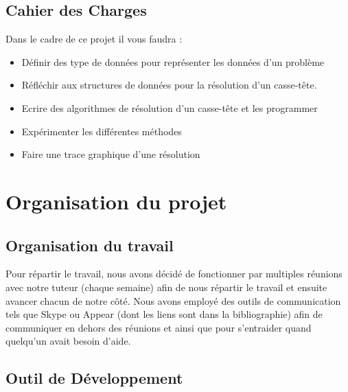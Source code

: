 \documentclass{article}
\begin{document}
   \subsection{\Large Cahier des Charges}
   Dans le cadre de ce projet il vous faudra :
   \begin{itemize}
       \item Définir des type de données pour représenter les données d'un problème
       \item Réfléchir aux structures de données pour la résolution d'un casse-tête.
       \item Ecrire des algorithmes de résolution d'un casse-tête et les programmer
       \item Expérimenter les différentes méthodes
       \item Faire une trace graphique d'une résolution
   \end{itemize}

\section{\LARGE Organisation du projet}

    \subsection{\Large Organisation du travail}

    \hspace{0.5cm} Pour répartir le travail, nous avons décidé de fonctionner par multiples réunions avec notre tuteur (chaque semaine) afin de nous répartir le travail et ensuite avancer chacun de notre côté. Nous avons employé des outils de communication tels que Skype ou Appear (dont les liens sont dans la bibliographie) afin de communiquer en dehors des réunions et ainsi que pour s'entraider quand quelqu'un avait besoin d'aide.\newline \newline




    \subsection{Outil de Développement}
\end{document}
